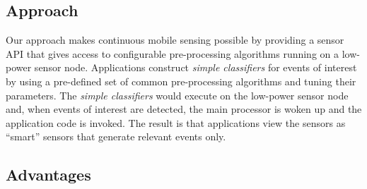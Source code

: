 \iffalse

We believe that a small set of pre-processing algorithms and parameter configuration
options would provide coverage of the early pipeline stages for a wide range of continuous
sensing applications. Moving and executing these early pipeline stages on a peripheral
processor contained on the sensor node can allow the main processor to remain asleep for extended periods of time, thus,
significantly reducing energy consumption and making mobile devices a viable platform for
prolonged execution of continuous sensing applications.

\fi

\subsection{Approach}

Our approach makes continuous mobile sensing possible by providing a sensor API
that gives access to configurable pre-processing algorithms running on a low-power
sensor node. Applications construct {\em simple classifiers} for events of interest by 
using a pre-defined set of common pre-processing algorithms and tuning their
parameters.  The {\em simple classifiers} would execute on the low-power sensor node and, 
when events of interest are detected, the main processor is woken up
and the application code is invoked. The result is that applications
view the sensors as ``smart'' sensors that generate relevant events
only. 

\iffalse
	Figure~\ref{fig:smartarchitecture} shows the architecture of a
	system that implements the Smartsensors abstraction.  Applications
	interact with a sensor manager and define custom wake-up conditions by
	choosing among the available pre-defined algorithms.  The figure also
	shows that the architecture supports recognition libraries that
	encapsulate the functionality of the Smartsensor to provide simple
	wake up conditions for a large number of activities.


	\begin{figure}[t]
		\texttt{[image: android\_smartsensor\_architecture\_proposed.png]}
		\caption{Smartsensor system architecture.}
		\label{fig:smartarchitecture}
	\end{figure}
\fi

\subsection{Advantages}

